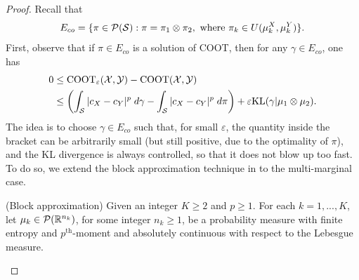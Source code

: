 \begin{proof}
    Recall that
    \begin{equation}
      E_{co} = \{ \pi \in \mathcal P(\mathcal S): \pi = \pi_1 \otimes \pi_2,
      \text{ where } \pi_k \in U(\mu_k^X, \mu_k^Y) \}.
    \end{equation}
    First, observe that if $\pi \in E_{co}$ is a solution of COOT, then for any $\gamma \in E_{co}$, one has
    \begin{equation}
      \begin{split}
        0 &\leq \text{COOT}_{\varepsilon}(\mathcal X, \mathcal Y) - \text{COOT}(\mathcal X, \mathcal Y) \\
        &\leq \left( \int_{\mathcal S} \vert c_X - c_Y \vert^p \; d\gamma - \int_{\mathcal S} \vert c_X - c_Y \vert^p \; d\pi \right) +
        \varepsilon \text{KL}(\gamma \vert \mu_1 \otimes \mu_2).
      \end{split}
    \end{equation}
    The idea is to choose $\gamma \in E_{co}$ such that, for small $\varepsilon$, the quantity inside the bracket can be arbitrarily small
    (but still positive, due to the optimality of $\pi$), and the KL divergence is always controlled, so that it does not blow up too fast.
    To do so, we extend the block approximation technique in
    \citep{Carlier17} to the multi-marginal case.
    \begin{definition}
      (Block approximation) Given an integer $K \geq 2$ and $p \geq 1$. For each $k=1,...,K$,
      let $\mu_k \in \mathcal P(\mathbb R^{n_k})$, for some integer $n_k \geq 1$, be a probability measure
      with finite entropy and $p^{\text{th}}$-moment and
      absolutely continuous with respect to the Lebesgue measure.


\end{definition}
\end{proof}
